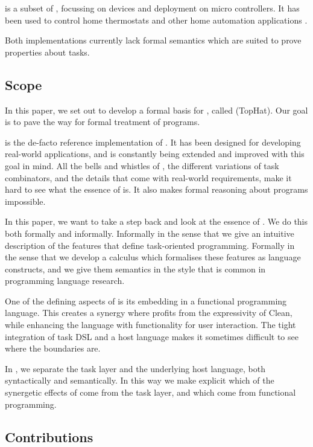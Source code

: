\MTASKS is a subset of \ITASKS,
focussing on \IOT devices and deployment on micro controllers.
It has been used to control home thermostats and other home automation applications \cite{koopman2018task}.

Both implementations currently lack formal semantics which are suited to prove properties about tasks.



\subsection{Scope}

In this paper, we set out to develop a formal basis for \TOP, called \TOPHAT (TopHat).
Our goal is to pave the way for formal treatment of \TOP programs.

\ITASKS is the de-facto reference implementation of \TOP.
It has been designed for developing real-world applications, and is constantly being extended and improved with this goal in mind.
All the bells and whistles of \ITASKS, the different variations of task combinators, and the details that come with real-world requirements, make it hard to see what the essence of \TOP is.
It also makes formal reasoning about \TOP programs impossible.

In this paper, we want to take a step back and look at the essence of \TOP.
We do this both formally and informally.
Informally in the sense that we give an intuitive description of the features that define task-oriented programming.
Formally in the sense that we develop a calculus which formalises these features as language constructs, and we give them semantics in the style that is common in programming language research.

One of the defining aspects of \ITASKS is its embedding in a functional programming language.
This creates a synergy where \ITASKS profits from the expressivity of Clean, while enhancing the language with functionality for user interaction.
The tight integration of task DSL and a host language makes it sometimes difficult to see where the boundaries are.

In \TOPHAT, we separate the task layer and the underlying host language, both syntactically and semantically.
In this way we make explicit which of the synergetic effects of \TOP come from the task layer, and which come from functional programming.


\subsection{Contributions}

